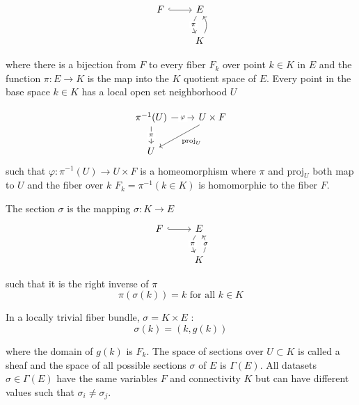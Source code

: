 \documentclass[../main.tex]{subfiles}
\begin{document}
\begin{equation}
    \begin{tikzcd}
        F \arrow[r, hook] & E \arrow[d, "\pi" description, bend right ] \\
                        & K \arrow[u, description, bend right]
    \end{tikzcd}
\end{equation}

where there is a bijection from $F$ to every fiber $F_k$ over point $k \in K$ in $E$ and the function $\pi: E \rightarrow K$ is the map into the $K$ quotient space of $E$. Every point in the base space $k \in K$ has a local open set neighborhood $U$ \cite{FiberBundle2020, rowlandFiberBundle}

\begin{equation}
    \begin{tikzcd}
        \pi^{-1}(U) \arrow[r, "\varphi" description] \arrow[d, "\pi" description] & U \times F \arrow[ld, "\mathrm{proj}_U"] \\
        U                                                                         &                                         
    \end{tikzcd}
\end{equation}
such that $\varphi: \pi^{-1}(U) \rightarrow U \times F$ is a homeomorphism where $\pi$ and $\mathrm{proj}_U$ both map to $U$ and the fiber over $k$ $F_k = \pi^{-1}({k \in K}) $ is homomorphic to the fiber $F$.

The section $\sigma$ is the mapping $\sigma: K\rightarrow E$ 
\begin{equation}
    \begin{tikzcd}
        F \arrow[r, hook] & E \arrow[d, "\pi" description, bend right]    \\
                          & K \arrow[u, "\sigma" description, bend right]
        \end{tikzcd}
\end{equation}

such that it is the right inverse of $\pi$
\begin{equation}
    \pi(\sigma(k)) = k \text{ for all } k \in K 
\end{equation}

In a locally trivial fiber bundle, $\sigma = K \times E$ \cite{rowlandFiberBundle,FiberBundle2020}:
\begin{equation}
\sigma(k) = (k, g(k))
\end{equation}

where the domain of $g(k)$ is $F_k$.  The space of sections over $U \subset K$ is called a sheaf and the space of all possible sections $\sigma$ of $E$ is $\Gamma(E)$. All datasets $\sigma \in \Gamma(E)$ have the same variables $F$ and connectivity $K$ but can have different values such that $\sigma_{i}\neq\sigma_{j}$.
\end{document}
